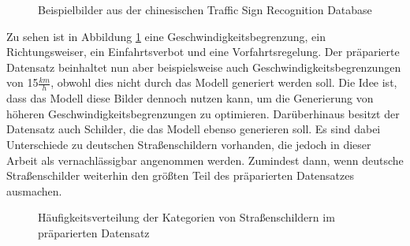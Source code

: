 \begin{figure}[H]
\begin{subfigure}[b]{0.125\textwidth}
     \caption{}
 \end{subfigure}
       \caption{Beispielbilder aus der chinesischen Traffic Sign Recognition Database \cite{chinese-dataset}}
       \label{fig:chinese-dataset-bsp-images}
 \end{figure}

Zu sehen ist in Abbildung \ref{fig:chinese-dataset-bsp-images} eine Geschwindigkeitsbegrenzung, ein Richtungsweiser, ein Einfahrtsverbot und eine Vorfahrtsregelung. Der präparierte Datensatz beinhaltet nun aber beispielsweise auch Geschwindigkeitsbegrenzungen von 15$\frac{km}{h}$, obwohl dies nicht durch das Modell generiert werden soll. Die Idee ist, dass das Modell diese Bilder dennoch nutzen kann, um die Generierung von höheren Geschwindigkeitsbegrenzungen zu optimieren. Darüberhinaus besitzt der Datensatz auch Schilder, die das Modell ebenso generieren soll. Es sind dabei Unterschiede zu deutschen Straßenschildern vorhanden, die jedoch in dieser Arbeit als vernachlässigbar angenommen werden. Zumindest dann, wenn deutsche Straßenschilder weiterhin den größten Teil des präparierten Datensatzes ausmachen. \cite{chinese-dataset}

\begin{figure}[H]
\caption{Häufigkeitsverteilung der Kategorien von Straßenschildern im präparierten Datensatz}
\end{figure}

